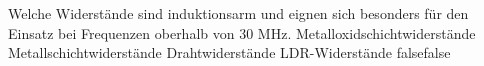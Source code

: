     {Welche Widerstände sind induktionsarm und eignen sich besonders für den Einsatz bei Frequenzen oberhalb von 30 MHz.}
    {Metalloxidschichtwiderstände}
    {Metallschichtwiderstände}
    {Drahtwiderstände}
    {LDR-Widerstände}
    {false}{false}